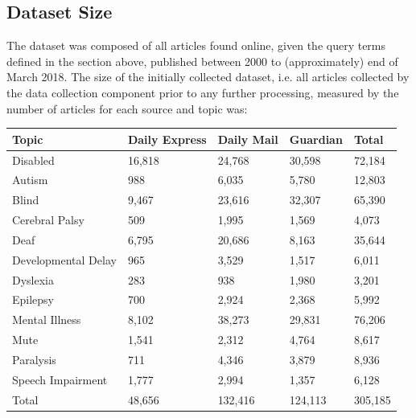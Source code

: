 \documentclass{report}
\begin{document}

\subsection{Dataset Size} \label{dataset-size}

The dataset was composed of all articles found online, given the query terms defined in the section above, published between 2000 to (approximately) end of March 2018.
The size of the initially collected dataset, i.e. all articles collected by the data collection component prior to any further processing, measured by the number of articles for each source and topic was:

\begin{center}
	\begin{tabu} to \textwidth { | X[c] | X[c] | X[c] | X[c] | X[c] | }
		\hline
		Topic & Daily Express & Daily Mail & Guardian & Total \\
		\hline
		Disabled & 16,818 & 24,768 & 30,598 & 72,184  \\
		\hline
		Autism & 988 & 6,035 & 5,780 & 12,803  \\
		\hline
		Blind & 9,467 & 23,616 & 32,307 & 65,390  \\
		\hline
		Cerebral Palsy & 509 & 1,995 & 1,569 & 4,073  \\
		\hline
		Deaf & 6,795 & 20,686 & 8,163 & 35,644  \\
		\hline
		Developmental Delay & 965 & 3,529 & 1,517 & 6,011  \\
		\hline
		Dyslexia & 283 & 938 & 1,980 & 3,201  \\
		\hline
		Epilepsy & 700 & 2,924 & 2,368 & 5,992  \\
		\hline
		Mental Illness & 8,102 & 38,273 & 29,831 & 76,206  \\
		\hline
		Mute & 1,541 & 2,312 & 4,764 & 8,617  \\
		\hline
		Paralysis & 711 & 4,346 & 3,879 & 8,936  \\
		\hline
		Speech Impairment & 1,777 & 2,994 & 1,357 & 6,128  \\
		\hline
		Total & 48,656 & 132,416 & 124,113 & 305,185  \\
		\hline
	\end{tabu}
\end{center}
\end{document}
